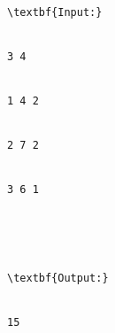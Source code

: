 \begin{verbatim}
\textbf{Input:}


3 4


1 4 2


2 7 2


3 6 1





\textbf{Output:}


15


\end{verbatim}